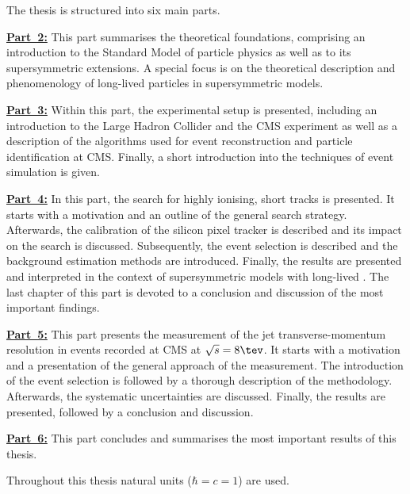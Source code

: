 \noindent The thesis is structured into six main parts.
\begin{description} 
\item \textbf{\hyperref[part:Theory]{Part~2:}} This part summarises the theoretical foundations, comprising an introduction to the Standard Model of particle physics as well as to its supersymmetric extensions. A special focus is on the theoretical description and phenomenology of long-lived particles in supersymmetric models. 
\item \textbf{\hyperref[part:Experiment]{Part~3:}} Within this part, the experimental setup is  presented, including an introduction to the Large Hadron Collider and the CMS experiment as well as a description of the algorithms used for event reconstruction and particle identification at CMS. Finally, a short introduction into the techniques of event simulation is given.
\item \textbf{\hyperref[part:analysis]{Part~4:}}  In this part, the search for highly ionising, short tracks is presented. It starts with a motivation and an outline of the general search strategy. Afterwards, the calibration of the silicon pixel tracker is described and its impact on the search is discussed. Subsequently, the event selection is described and the background estimation methods are introduced. Finally, the results are presented and interpreted in the context of supersymmetric models with long-lived \chipm. The last chapter of this part is devoted to a conclusion and discussion of the most important findings.
\item \textbf{\hyperref[part:resolution]{Part~5:}} This part presents the measurement of the jet transverse-momentum resolution in \GAMJET events recorded at CMS at $\sqrt{s}=8\tev$. It starts with a motivation and a presentation of the general approach of the measurement. The introduction of the event selection is followed by a thorough description of the methodology. Afterwards, the systematic uncertainties are discussed. Finally, the results are presented, followed by a conclusion and discussion.
\item \textbf{\hyperref[part:Summary]{Part~6:}} This part concludes and summarises the most important results of this thesis. 
\end{description}
Throughout this thesis natural units ($\hbar = c = 1$) are used.
